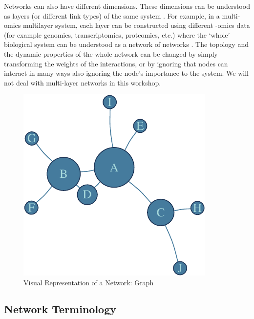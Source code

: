 \documentclass[
]{book}
\begin{document}
Networks can also have different dimensions. These dimensions can be understood as layers (or different link types) of the same system \citep{Kurant2006LayeredNetworks, Kivela2014MultilayerNetworks}. For example, in a multi-omics multilayer system, each layer can be constructed using different -omics data (for example genomics, transcriptomics, proteomics, etc.) where the `whole' biological system can be understood as a network of networks \citep{DeDomenico2017}. The topology and the dynamic properties of the whole network can be changed by simply transforming the weights of the interactions, or by ignoring that nodes can interact in many ways \citep{Mucha2010CommunityNetworks, Radicchi2013AbruptNetworks} also ignoring the node's importance to the system. We will not deal with multi-layer networks in this workshop.

\begin{figure}

{\centering \includegraphics[width=0.8\linewidth]{NetMed_files/figure-latex/GRAPH-1} 

}

\caption{Visual Representation of a Network: Graph}\label{fig:GRAPH}
\end{figure}

\hypertarget{network-terminology}{%
\subsection{Network Terminology}\label{network-terminology}}
\end{document}

